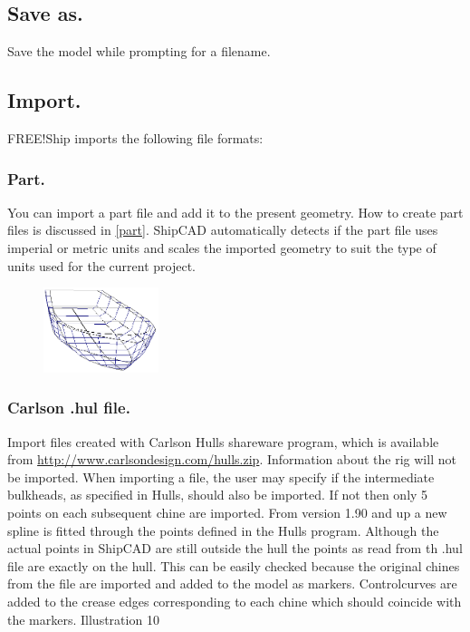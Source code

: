 \documentclass[12pt]{article}
\begin{document}
\subsection{Save as.}
Save the model while prompting for a filename.

\subsection{Import.}
FREE!Ship imports the following file formats:

\subsubsection{Part.}
You can import a part file and add it to the present geometry. How to
create part files is discussed in \ref{part}. ShipCAD automatically
detects if the part file uses imperial or metric units and scales the
imported geometry to suit the type of units used for the current
project.

\begin{figure}
        \centering
        \includegraphics[width=0.3\textwidth,natwidth=311,natheight=229]{filecarlson.png}
        \caption{}
        \label{fig:carlson}
\end{figure}

\subsubsection{Carlson .hul file.}
Import files created with Carlson Hulls shareware program, which is
available from
\url{http://www.carlsondesign.com/hulls.zip}. Information about the rig will not be imported. When
importing a file, the user may specify if the intermediate bulkheads, as specified in Hulls, should
also be imported. If not then only 5 points on each subsequent chine are imported. From version
1.90 and up a new spline is fitted through the points defined in
the Hulls program. Although the actual points in ShipCAD are
still outside the hull the points as read from th .hul file are
exactly on the hull. This can be easily checked because the
original chines from the file are imported and added to the
model as markers. Controlcurves are added to the crease
edges corresponding to each chine which should coincide with
the markers.
Illustration 10
\end{document}
